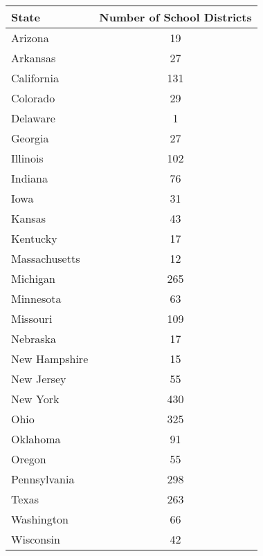 \begin{tabularx}{\linewidth}{@{}lC@{}}

\toprule
{State}&{Number of School Districts} \tabularnewline
\midrule \addlinespace[\belowrulesep]
Arizona&19 \tabularnewline
Arkansas&27 \tabularnewline
California&131 \tabularnewline
Colorado&29 \tabularnewline
Delaware&1 \tabularnewline
Georgia&27 \tabularnewline
Illinois&102 \tabularnewline
Indiana&76 \tabularnewline
Iowa&31 \tabularnewline
Kansas&43 \tabularnewline
Kentucky&17 \tabularnewline
Massachusetts&12 \tabularnewline
Michigan&265 \tabularnewline
Minnesota&63 \tabularnewline
Missouri&109 \tabularnewline
Nebraska&17 \tabularnewline
New Hampshire&15 \tabularnewline
New Jersey&55 \tabularnewline
New York&430 \tabularnewline
Ohio&325 \tabularnewline
Oklahoma&91 \tabularnewline
Oregon&55 \tabularnewline
Pennsylvania&298 \tabularnewline
Texas&263 \tabularnewline
Washington&66 \tabularnewline
Wisconsin&42 \tabularnewline
\bottomrule 

\end{tabularx}

